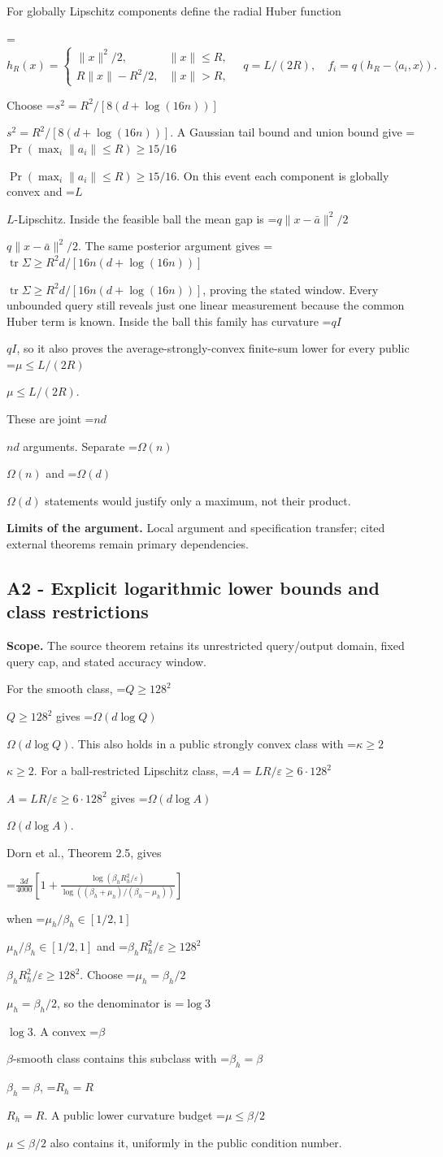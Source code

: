 \documentclass[10pt,a4paper]{article}
\newcommand{\AtlasMath}[1]{\par\begingroup\centering\setbox0=\hbox{$\displaystyle #1$}\ifdim\wd0>1.4\linewidth\typeout{ATLAS WIDE FORMULA: \the\wd0}\fi\ifdim\wd0>\linewidth\resizebox{\linewidth}{!}{\box0}\else\box0\fi\par\endgroup}
\newcommand{\AtlasInlineMath}[1]{\begingroup\setbox0=\hbox{$#1$}\ifdim\wd0>.4\linewidth\endgroup\AtlasMath{#1}\else\endgroup$#1$\fi}
\begin{document}
For globally Lipschitz components define the radial Huber function

\AtlasMath{h_R(x)=\begin{cases}\|x\|^2/2,&\|x\|\le R,\\R\|x\|-R^2/2,&\|x\|>R,\end{cases}\quad q=L/(2R),\quad f_i=q(h_R-\langle a_i,x\rangle).}

Choose \AtlasInlineMath{s^2=R^2/[8(d+\log(16n))]}. A Gaussian tail bound and union bound give \AtlasInlineMath{\Pr(\max_i\|a_i\|\le R)\ge15/16}. On this event each component is globally convex and \AtlasInlineMath{L}-Lipschitz. Inside the feasible ball the mean gap is \AtlasInlineMath{q\|x-\bar a\|^2/2}. The same posterior argument gives \AtlasInlineMath{\operatorname{tr}\Sigma\ge R^2d/[16n(d+\log(16n))]}, proving the stated window. Every unbounded query still reveals just one linear measurement because the common Huber term is known. Inside the ball this family has curvature \AtlasInlineMath{qI}, so it also proves the average-strongly-convex finite-sum lower for every public \AtlasInlineMath{\mu\le L/(2R)}.

These are joint \AtlasInlineMath{nd} arguments. Separate \AtlasInlineMath{\Omega(n)} and \AtlasInlineMath{\Omega(d)} statements would justify only a maximum, not their product.

\textbf{Limits of the argument.} Local argument and specification transfer; cited external theorems remain primary dependencies.

\subsection{A2 - Explicit logarithmic lower bounds and class restrictions}
\textbf{Scope.} The source theorem retains its unrestricted query/output domain, fixed query cap, and stated accuracy window.

For the smooth class, \AtlasInlineMath{Q\ge128^2} gives \AtlasInlineMath{\Omega(d\log Q)}. This also holds in a public strongly convex class with \AtlasInlineMath{\kappa\ge2}. For a ball-restricted Lipschitz class, \AtlasInlineMath{A=LR/\varepsilon\ge6\cdot128^2} gives \AtlasInlineMath{\Omega(d\log A)}.

Dorn et al., Theorem 2.5, gives

\AtlasMath{\frac{3d}{4000}\left[1+\frac{\log(\beta_hR_h^2/\varepsilon)}{\log((\beta_h+\mu_h)/(\beta_h-\mu_h))}\right]}

when \AtlasInlineMath{\mu_h/\beta_h\in[1/2,1]} and \AtlasInlineMath{\beta_hR_h^2/\varepsilon\ge128^2}. Choose \AtlasInlineMath{\mu_h=\beta_h/2}, so the denominator is \AtlasInlineMath{\log3}. A convex \AtlasInlineMath{\beta}-smooth class contains this subclass with \AtlasInlineMath{\beta_h=\beta}, \AtlasInlineMath{R_h=R}. A public lower curvature budget \AtlasInlineMath{\mu\le\beta/2} also contains it, uniformly in the public condition number.
\end{document}
